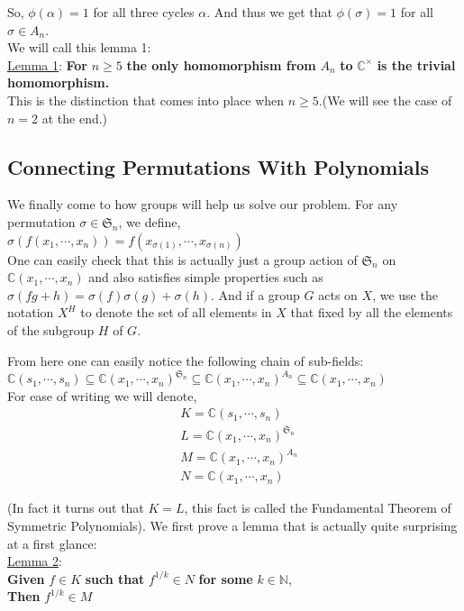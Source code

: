 So, $\phi(\alpha)=1$ for all three cycles $\alpha$. And thus we get that $\phi(\sigma)=1$ for all $\sigma\in A_n$.\\

We will call this lemma 1:\\
\underline{Lemma 1}:
\textbf{For } $n\geq 5$ \textbf{ the only homomorphism from } $A_n$ \textbf{ to } $\mathbb{C}^{\times}$ \textbf{ is the trivial homomorphism.}\\

This is the distinction that comes into place when $n\geq 5$.(We will see the case of $n=2$ at the end.)

\subsection{Connecting Permutations With Polynomials}

We finally come to how groups will help us solve our problem. For any permutation $\sigma\in\mathfrak{S}_n$, we define,\\
$\sigma(f(x_1,\cdots,x_n))=f(x_{\sigma(1)},\cdots,x_{\sigma(n)})$\\
One can easily check that this is actually just a group action of $\mathfrak{S}_n$ on $\mathbb{C}(x_1,\cdots,x_n)$ and also satisfies simple properties such as $\sigma(fg+h)=\sigma(f)\sigma(g)+\sigma(h)$. And if a group $G$ acts on $X$, we use the notation $X^H$ to denote the set of all elements in $X$ that fixed by all the elements of the subgroup $H$ of $G$.

From here one can easily notice the following chain of sub-fields:\\

$\mathbb{C}(s_1,\cdots,s_n)\subseteq\mathbb{C}(x_1,\cdots,x_n)^{\mathfrak{S}_n}\subseteq\mathbb{C}(x_1,\cdots,x_n)^{A_n}\subseteq\mathbb{C}(x_1,\cdots,x_n)$\\

For ease of writing we will denote,
\begin{align*}
&K=\mathbb{C}(s_1,\cdots,s_n)\\
&L=\mathbb{C}(x_1,\cdots,x_n)^{\mathfrak{S}_n}\\
&M=\mathbb{C}(x_1,\cdots,x_n)^{A_n}\\
&N=\mathbb{C}(x_1,\cdots,x_n)
\end{align*}

(In fact it turns out that $K=L$, this fact is called the Fundamental Theorem of Symmetric Polynomials). We first prove a lemma that is actually quite surprising at a first glance:\\
\underline{Lemma 2}:\\
\textbf{Given } $f\in K$ \textbf{ such that } $f^{1/k}\in N$ \textbf{ for some } $k\in\mathbb{N}$,\\
\textbf{Then } $f^{1/k}\in M$



